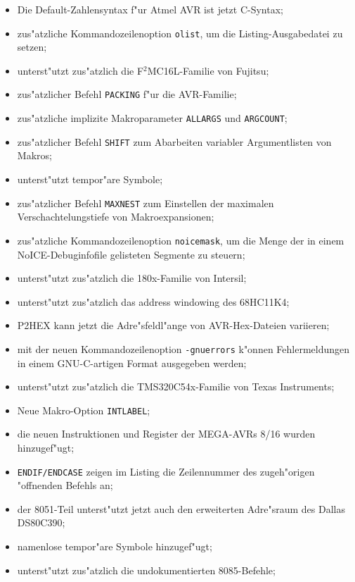 \documentclass[12pt,a4paper,twoside]{report}
\begin{document}
\begin{itemize}
{\begin{itemize}
      \item{Die Default-Zahlensyntax f"ur Atmel AVR ist jetzt C-Syntax;}
      \item{zus"atzliche Kommandozeilenoption {\tt olist}, um die
            Listing-Ausgabedatei zu setzen;}
      \item{unterst"utzt zus"atzlich die F$^{2}$MC16L-Familie von Fujitsu;}
      \item{zus"atzlicher Befehl {\tt PACKING} f"ur die AVR-Familie;}
      \item{zus"atzliche implizite Makroparameter {\tt ALLARGS} und
            {\tt ARGCOUNT};}
      \item{zus"atzlicher Befehl {\tt SHIFT} zum Abarbeiten variabler
            Argumentlisten von Makros;}
      \item{unterst"utzt tempor"are Symbole;}
      \item{zus"atzlicher Befehl {\tt MAXNEST} zum Einstellen der
            maximalen Verschachtelungstiefe von Makroexpansionen;}
      \item{zus"atzliche Kommandozeilenoption {\tt noicemask}, um
            die Menge der in einem NoICE-Debuginfofile gelisteten Segmente
            zu steuern;}
      \item{unterst"utzt zus"atzlich die 180x-Familie von Intersil;}
      \item{unterst"utzt zus"atzlich das address windowing des 68HC11K4;}
      \item{P2HEX kann jetzt die Adre"sfeldl"ange von AVR-Hex-Dateien
            variieren;}
      \item{mit der neuen Kommandozeilenoption {\tt -gnuerrors} k"onnen
            Fehlermeldungen in einem GNU-C-artigen Format ausgegeben
            werden;}
      \item{unterst"utzt zus"atzlich die TMS320C54x-Familie von Texas
            Instruments;}
      \item{Neue Makro-Option {\tt INTLABEL};}
      \item{die neuen Instruktionen und Register der MEGA-AVRs 8/16
            wurden hinzugef"ugt;}
      \item{{\tt ENDIF/ENDCASE} zeigen im Listing die Zeilennummer des
            zugeh"origen "offnenden Befehls an;}
      \item{der 8051-Teil unterst"utzt jetzt auch den erweiterten
            Adre"sraum des Dallas DS80C390;}
      \item{namenlose tempor"are Symbole hinzugef"ugt;}
      \item{unterst"utzt zus"atzlich die undokumentierten 8085-Befehle;}

\end{itemize}}
\end{itemize}
\end{document}
